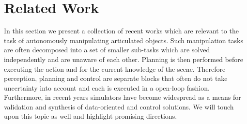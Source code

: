 \section{Related Work}
\label{sec:Related Work}


In this section we present a collection of recent works which are relevant to the task of autonomously manipulating articulated objects. Such manipulation tasks are often decomposed into a set of smaller sub-tasks which are solved independently and are unaware of each other. Planning is then performed before executing the action and for the current knowledge of the scene. Therefore perception, planning and control are separate blocks that often do not take uncertainty into account and each is executed in a open-loop fashion. Furthermore, in recent years simulators have become widespread as a means for validation and synthesis of data-oriented and control solutions. We will touch upon this topic as well and highlight promising directions.

